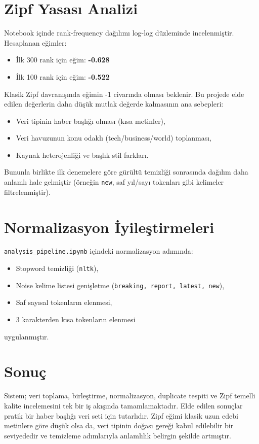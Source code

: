 \documentclass[12pt,a4paper]{article}
\begin{document}
\section{Zipf Yasas\i{} Analizi}
Notebook i\c{c}inde rank-frequency da\u{g}\i{}l\i{}m\i{} log-log d\"uzleminde incelenmi\c{s}tir. Hesaplanan e\u{g}imler:
\begin{itemize}
    \item \.{I}lk 300 rank i\c{c}in e\u{g}im: \textbf{-0.628}
    \item \.{I}lk 100 rank i\c{c}in e\u{g}im: \textbf{-0.522}
\end{itemize}

Klasik Zipf davran\i{}\c{s}\i{}nda e\u{g}imin -1 civar\i{}nda olmas\i{} beklenir. Bu projede elde edilen de\u{g}erlerin daha d\"u\c{s}\"uk mutlak de\u{g}erde kalmas\i{}n\i{}n ana sebepleri:
\begin{itemize}
    \item Veri tipinin haber ba\c{s}l\i{}\u{g}\i{} olmas\i{} (k\i{}sa metinler),
    \item Veri havuzunun konu odakl\i{} (tech/business/world) toplanmas\i{},
    \item Kaynak heterojenli\u{g}i ve ba\c{s}l\i{}k stil farklar\i{}.
\end{itemize}

Bununla birlikte ilk denemelere g\"ore g\"ur\"ult\"u temizli\u{g}i sonras\i{}nda da\u{g}\i{}l\i{}m daha anlaml\i{} hale gelmi\c{s}tir (\"orne\u{g}in \texttt{new}, saf y\i{}l/say\i{} tokenlar\i{} gibi kelimeler filtrelenmi\c{s}tir).

\section{Normalizasyon \.Iyile\c{s}tirmeleri}
\texttt{analysis\_pipeline.ipynb} i\c{c}indeki normalizasyon ad\i{}m\i{}nda:
\begin{itemize}
    \item Stopword temizli\u{g}i (\texttt{nltk}),
    \item Noise kelime listesi geni\c{s}letme (\texttt{breaking, report, latest, new}),
    \item Saf say\i{}sal tokenlar\i{}n elenmesi,
    \item 3 karakterden k\i{}sa tokenlar\i{}n elenmesi
\end{itemize}
uygulanm\i{}\c{s}t\i{}r.

\section{Sonu\c{c}}
Sistem; veri toplama, birle\c{s}tirme, normalizasyon, duplicate tespiti ve Zipf temelli kalite incelemesini tek bir i\c{s} ak\i{}\c{s}\i{}nda tamamlamaktad\i{}r. Elde edilen sonu\c{c}lar pratik bir haber ba\c{s}l\i{}\u{g}\i{} veri seti i\c{c}in tutarl\i{}d\i{}r. Zipf e\u{g}imi klasik uzun edebi metinlere g\"ore d\"u\c{s}\"uk olsa da, veri tipinin do\u{g}as\i{} gere\u{g}i kabul edilebilir bir seviyededir ve temizleme ad\i{}mlar\i{}yla anlaml\i{}l\i{}k belirgin \c{s}ekilde artm\i{}\c{s}t\i{}r.
\end{document}
